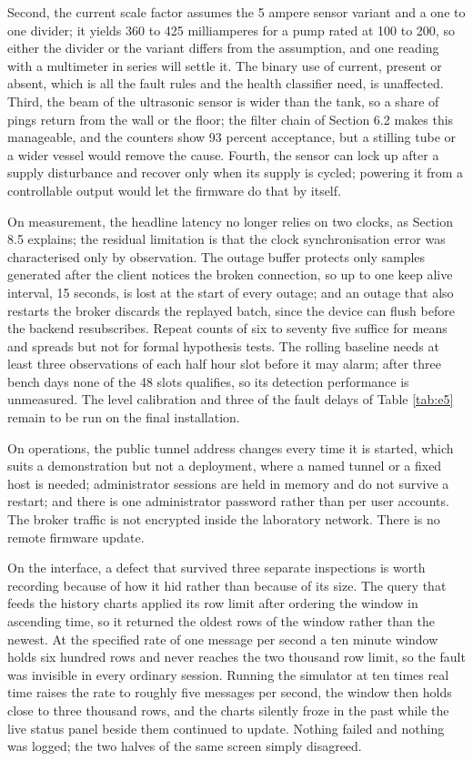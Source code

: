 Second, the current scale factor assumes the 5 ampere sensor variant and a one to one divider; it yields 360 to 425 milliamperes for a pump rated at 100 to 200, so either the divider or the variant differs from the assumption, and one reading with a multimeter in series will settle it. The binary use of current, present or absent, which is all the fault rules and the health classifier need, is unaffected. Third, the beam of the ultrasonic sensor is wider than the tank, so a share of pings return from the wall or the floor; the filter chain of Section 6.2 makes this manageable, and the counters show 93 percent acceptance, but a stilling tube or a wider vessel would remove the cause. Fourth, the sensor can lock up after a supply disturbance and recover only when its supply is cycled; powering it from a controllable output would let the firmware do that by itself.

On measurement, the headline latency no longer relies on two clocks, as Section 8.5 explains; the residual limitation is that the clock synchronisation error was characterised only by observation. The outage buffer protects only samples generated after the client notices the broken connection, so up to one keep alive interval, 15 seconds, is lost at the start of every outage; and an outage that also restarts the broker discards the replayed batch, since the device can flush before the backend resubscribes. Repeat counts of six to seventy five suffice for means and spreads but not for formal hypothesis tests. The rolling baseline needs at least three observations of each half hour slot before it may alarm; after three bench days none of the 48 slots qualifies, so its detection performance is unmeasured. The level calibration and three of the fault delays of Table \ref{tab:e5} remain to be run on the final installation.

On operations, the public tunnel address changes every time it is started, which suits a demonstration but not a deployment, where a named tunnel or a fixed host is needed; administrator sessions are held in memory and do not survive a restart; and there is one administrator password rather than per user accounts. The broker traffic is not encrypted inside the laboratory network. There is no remote firmware update.

On the interface, a defect that survived three separate inspections is worth recording because of how it hid rather than because of its size. The query that feeds the history charts applied its row limit after ordering the window in ascending time, so it returned the oldest rows of the window rather than the newest. At the specified rate of one message per second a ten minute window holds six hundred rows and never reaches the two thousand row limit, so the fault was invisible in every ordinary session. Running the simulator at ten times real time raises the rate to roughly five messages per second, the window then holds close to three thousand rows, and the charts silently froze in the past while the live status panel beside them continued to update. Nothing failed and nothing was logged; the two halves of the same screen simply disagreed.

